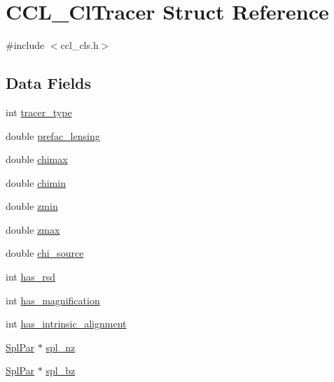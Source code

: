 \hypertarget{struct_c_c_l___cl_tracer}{}\section{C\+C\+L\+\_\+\+Cl\+Tracer Struct Reference}
\label{struct_c_c_l___cl_tracer}


{\ttfamily \#include $<$ccl\+\_\+cls.\+h$>$}

\subsection*{Data Fields}
\begin{DoxyCompactItemize}
\item 
int \mbox{\hyperlink{struct_c_c_l___cl_tracer_a782f0812a2c0ebf86f9dda4d2d893507}{tracer\+\_\+type}}
\item 
double \mbox{\hyperlink{struct_c_c_l___cl_tracer_ae8f4fab867f33693c511b4faa5040844}{prefac\+\_\+lensing}}
\item 
double \mbox{\hyperlink{struct_c_c_l___cl_tracer_abecca79aa244fbc52bb07faece651988}{chimax}}
\item 
double \mbox{\hyperlink{struct_c_c_l___cl_tracer_ad7be7e9b48dfc1259f5a021d51f97eaa}{chimin}}
\item 
double \mbox{\hyperlink{struct_c_c_l___cl_tracer_ae44938293ee360a536f3bfd2bb9570c4}{zmin}}
\item 
double \mbox{\hyperlink{struct_c_c_l___cl_tracer_ad7a6c9c9f67c153a04a047fcc65a7512}{zmax}}
\item 
double \mbox{\hyperlink{struct_c_c_l___cl_tracer_a30b515b52f45e8281846749af76756ad}{chi\+\_\+source}}
\item 
int \mbox{\hyperlink{struct_c_c_l___cl_tracer_a2fd0fa101614e87cc8b78fa6fff78b8e}{has\+\_\+rsd}}
\item 
int \mbox{\hyperlink{struct_c_c_l___cl_tracer_a2144bb85ca1a13bf4d3bfa50c81b76aa}{has\+\_\+magnification}}
\item 
int \mbox{\hyperlink{struct_c_c_l___cl_tracer_a7f46320f8de31772bc705f73f1dee4cb}{has\+\_\+intrinsic\+\_\+alignment}}
\item 
\mbox{\hyperlink{struct_spl_par}{Spl\+Par}} $\ast$ \mbox{\hyperlink{struct_c_c_l___cl_tracer_aac45004e79118de3066f7cb36ba5c816}{spl\+\_\+nz}}
\item 
\mbox{\hyperlink{struct_spl_par}{Spl\+Par}} $\ast$ \mbox{\hyperlink{struct_c_c_l___cl_tracer_a8efd94b42acc38fdbde6006537232cd5}{spl\+\_\+bz}}
\item 

\end{DoxyCompactItemize}
